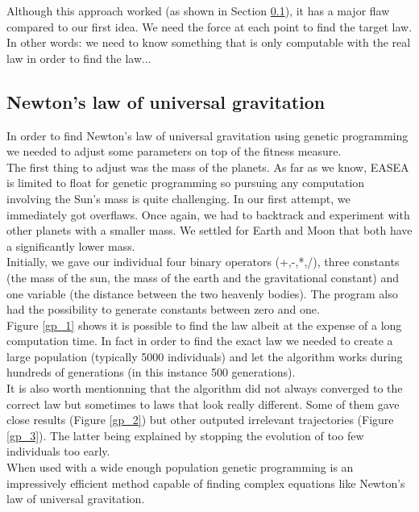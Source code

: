 Although this approach worked (as shown in Section \ref{gp}), it
has a major flaw compared to our first idea. We need the force at each
point to find
the target law. In other words: we need to know something that is only
computable with the
real law in order to find the law...\\

\subsection{Newton's law of universal gravitation}
\label{gp}
In order to find Newton's law of universal gravitation using genetic
programming we needed to adjust some parameters on top of the fitness
measure.\\

The first thing to adjust was the mass of the planets. As far as we know, EASEA
is limited to float for genetic programming so pursuing any computation
involving the Sun's mass is quite challenging. In our first attempt, we
immediately got overflaws. Once again, we had to backtrack and experiment with
other planets with a smaller mass. We settled for Earth and Moon that both have
a significantly lower mass.\\

Initially, we gave our individual four binary operators (+,-,*,/), three
constants (the mass of the sun, the mass of the earth and the gravitational
constant) and
one variable (the distance between the two heavenly bodies). The program also
had the possibility to generate constants between zero and one.\\

Figure \ref{gp_1} shows it is possible to find the law albeit at the expense of
a long computation time. In fact in order to find the exact law we needed to
create a large population (typically 5000 individuals) and let the algorithm
works during hundreds of generations (in this instance 500 generations).\\

It is also worth mentionning that the algorithm did not always converged to the
correct law but sometimes to laws that look really different. Some of them gave
close results (Figure
\ref{gp_2}) but other outputed irrelevant trajectories (Figure
\ref{gp_3}). The latter being explained by stopping the evolution of too few
individuals too early.\\

When used with a wide enough population genetic programming is an impressively
efficient method capable of finding complex equations like Newton's law of
universal gravitation.\\

